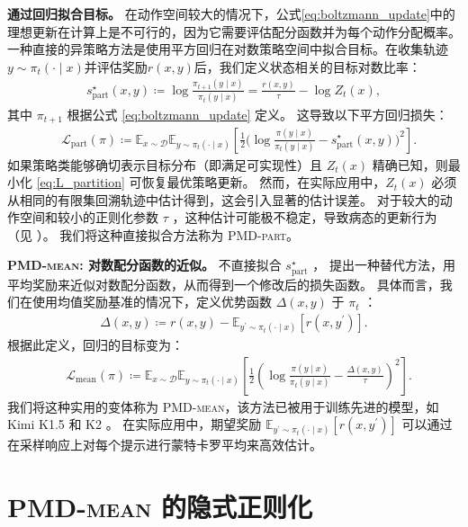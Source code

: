 \documentclass{article}
\theoremstyle{plain}
\theoremstyle{definition}
\theoremstyle{remark}
\newcommand{\E}{\mathbb{E}}
\begin{document}
\textbf{通过回归拟合目标。}
在动作空间较大的情况下，公式\eqref{eq:boltzmann_update}中的理想更新在计算上是不可行的，因为它需要评估配分函数并为每个动作分配概率。
一种直接的异策略方法是使用平方回归在对数策略空间中拟合目标。在收集轨迹$y\sim \pi_t(\cdot\mid x)$并评估奖励$r(x,y)$后，我们定义状态相关的目标对数比率：
\begin{align*}
    s^\star_{\mathrm{part}}(x,y)
    \coloneqq\log \frac{\pi_{t+1}(y\mid x)}{\pi_t(y\mid x)}
    = \frac{r(x,y)}{\tau} - \log Z_t(x),
\end{align*}
其中 $\pi_{t+1}$ 根据公式 \eqref{eq:boltzmann_update} 定义。  
这导致以下平方回归损失： 
\begin{align}
    &\mathcal{L}_{\mathrm{part}}(\pi)
    \coloneqq\E_{x\sim \mathcal{D}}\E_{y\sim \pi_t(\cdot\mid x)}\left[\frac{1}{2}\Big(\log \frac{\pi(y\mid x)}{\pi_t(y\mid x)} - s^\star_{\mathrm{part}}(x, y)\Big)^2\right].
    \label{eq:L_partition}
\end{align}
如果策略类能够确切表示目标分布（即满足可实现性）且 $Z_t(x)$  精确已知，则最小化 \eqref{eq:L_partition}  可恢复最优策略更新。  
然而，在实际应用中，$Z_t(x)$  必须从相同的有限集回溯轨迹中估计得到，这会引入显著的估计误差。  
对于较大的动作空间和较小的正则化参数 $\tau$ ，这种估计可能极不稳定，导致病态的更新行为（见 ）。  
我们将这种直接拟合方法称为 \textsc{PMD-part}。

\textbf{\textsc{PMD-mean}: 对数配分函数的近似。}
不直接拟合 $s^\star_{\mathrm{part}}$ ，\citet{team2025kimik15} 提出一种替代方法，用平均奖励来近似对数配分函数，从而得到一个修改后的损失函数。
具体而言，我们在使用均值奖励基准的情况下，定义优势函数 $\Delta(x,y)$ 于 $\pi_t$ ：
\begin{align*}
\Delta(x,y) \coloneqq r(x,y) - \mathbb{E}_{y^\prime\sim \pi_t(\cdot\mid x)}[r(x,y^\prime)].
\end{align*}
根据此定义，回归的目标变为：
\begin{align}
    &\mathcal{L}_{\mathrm{mean}}(\pi)
    \coloneqq\E_{x\sim \mathcal{D}}\E_{y\sim \pi_t(\cdot\mid x)}\left[\frac{1}{2}\left(\log \frac{\pi(y\mid x)}{\pi_t(y\mid x)}-\frac{\Delta(x,y)}{\tau}\right)^2\right].
    \label{eq:L_mean}
\end{align}
我们将这种实用的变体称为 \textsc{PMD-mean}，该方法已被用于训练先进的模型，如 Kimi K1.5 和 K2 \citep{team2025kimik15,team2025kimik20}。  
在实际应用中，期望奖励 $\mathbb{E}_{y^\prime\sim \pi_t(\cdot\mid x)}[r(x,y^\prime)]$ 可以通过在采样响应上对每个提示进行蒙特卡罗平均来高效估计。


\section{\textsc{PMD-mean} 的隐式正则化}
\label{sec:pmdmean}
\end{document}
